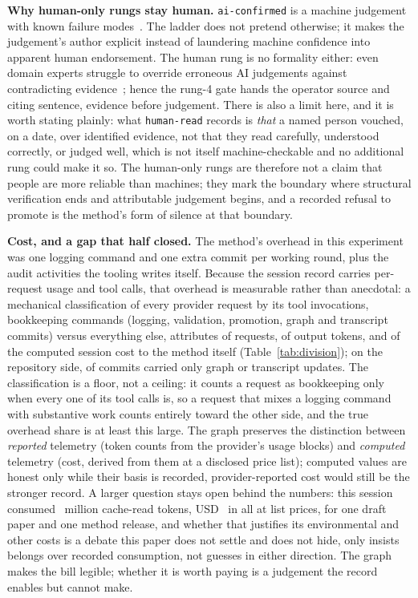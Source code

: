 \textbf{Why human-only rungs stay human.} \texttt{ai-confirmed} is a
machine judgement with known failure
modes~\cite{ai-hallucination2023}. The ladder does not pretend
otherwise; it makes the judgement's author explicit instead of
laundering machine confidence into apparent human endorsement. The
human rung is no formality either: even domain experts struggle to
override erroneous AI judgements against contradicting
evidence~\cite{doctors-vs-algorithms2026}; hence the rung-4 gate
hands the operator source and citing sentence, evidence before
judgement. There is also a limit here, and it is worth stating
plainly: what \texttt{human-read} records is \emph{that} a named
person vouched, on a date, over identified evidence, not that they
read carefully, understood correctly, or judged well, which is not
itself machine-checkable and no additional rung could make it so. The
human-only rungs are therefore not a claim that people are more
reliable than machines; they mark the boundary where structural
verification ends and attributable judgement begins, and a recorded
refusal to promote is the method's form of silence at that boundary.

\textbf{Cost, and a gap that half closed.} The method's overhead in
this experiment was one logging command and one extra commit per
working round, plus the audit activities the tooling writes itself.
Because the session record carries per-request usage and tool calls,
that overhead is measurable rather than anecdotal: a mechanical
classification of every provider request by its tool invocations,
bookkeeping commands (logging, validation, promotion, graph and
transcript commits) versus everything else, attributes
\MOverReqPct{} of requests, \MOverOutPct{} of output tokens, and
\MOverCostPct{} of the computed session cost to the method itself
(Table~\ref{tab:division}); on the repository side, \MBookCommits{}
of \MCommits{} commits carried only graph or transcript updates. The
classification is a floor, not a ceiling: it counts a request as
bookkeeping only when every one of its tool calls is, so a request
that mixes a logging command with substantive work counts entirely
toward the other side, and the true overhead share is at least this
large. The graph preserves the distinction
between \emph{reported} telemetry (token counts from the provider's
usage blocks) and \emph{computed} telemetry (cost, derived from them
at a disclosed price list); computed values are honest only while
their basis is recorded, provider-reported cost would still be the
stronger record. A larger question stays open behind the numbers:
this session consumed \MCacheReadMint~million cache-read tokens,
USD~\MCostUSD{} in all at list prices, for one draft paper and one
method release, and whether that justifies its environmental and
other costs is a debate this paper does not settle and does not hide,
only insists belongs over recorded consumption, not guesses in either
direction. The graph makes the bill legible; whether it is worth
paying is a judgement the record enables but cannot make.

